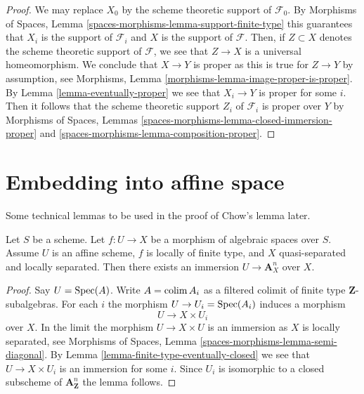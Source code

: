 \begin{proof}
We may replace $X_0$ by the scheme theoretic support of $\mathcal{F}_0$.
By Morphisms of Spaces, Lemma \ref{spaces-morphisms-lemma-support-finite-type}
this guarantees that $X_i$ is the support of $\mathcal{F}_i$ and $X$ is the
support of $\mathcal{F}$. Then, if $Z \subset X$ denotes the scheme
theoretic support of $\mathcal{F}$, we see that $Z \to X$ is a universal
homeomorphism. We conclude that $X \to Y$ is proper as this is true for
$Z \to Y$ by assumption, see
Morphisms, Lemma \ref{morphisms-lemma-image-proper-is-proper}.
By Lemma \ref{lemma-eventually-proper} we see that $X_i \to Y$ is proper
for some $i$. Then it follows that the scheme theoretic support $Z_i$ of
$\mathcal{F}_i$ is proper over $Y$ by
Morphisms of Spaces, Lemmas
\ref{spaces-morphisms-lemma-closed-immersion-proper} and
\ref{spaces-morphisms-lemma-composition-proper}.
\end{proof}








\section{Embedding into affine space}
\label{section-embedding}

\noindent
Some technical lemmas to be used in the proof of Chow's lemma later.

\begin{lemma}
\label{lemma-embedding-into-affine-over-ls-qs}
Let $S$ be a scheme. Let $f : U \to X$ be a morphism of algebraic
spaces over $S$. Assume $U$ is an affine scheme, $f$ is locally of
finite type, and $X$ quasi-separated and locally separated.
Then there exists an immersion $U \to \mathbf{A}^n_X$ over $X$.
\end{lemma}

\begin{proof}
Say $U = \mathop{\mathrm{Spec}}(A)$. Write $A = \mathop{\mathrm{colim}}\nolimits A_i$ as a filtered colimit
of finite type $\mathbf{Z}$-subalgebras. For each $i$ the morphism
$U \to U_i = \mathop{\mathrm{Spec}}(A_i)$ induces a morphism
$$
U \longrightarrow X \times U_i
$$
over $X$. In the limit the morphism $U \to X \times U$ is an immersion
as $X$ is locally separated, see
Morphisms of Spaces, Lemma
\ref{spaces-morphisms-lemma-semi-diagonal}.
By Lemma \ref{lemma-finite-type-eventually-closed}
we see that $U \to X \times U_i$ is an immersion for some $i$.
Since $U_i$ is isomorphic to a closed subscheme of
$\mathbf{A}^n_{\mathbf{Z}}$ the lemma follows.
\end{proof}

